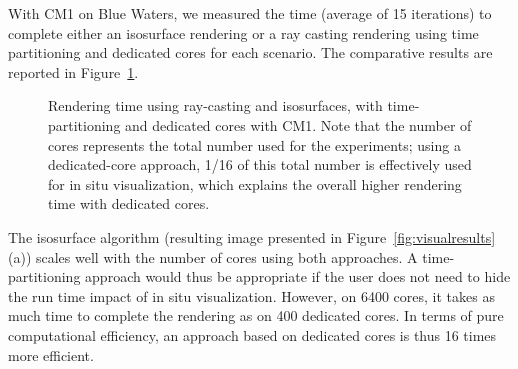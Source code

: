 With CM1 on Blue Waters, we measured the time (average of 15 
iterations) to complete either an isosurface rendering or a ray casting
rendering using time partitioning and dedicated cores for each scenario. 
The comparative results are reported in Figure~\ref{fig:cm1vistime}.

\begin{figure}[t]
\centering
	\quad
	\caption{Rendering time using ray-casting and isosurfaces, with 
	time-partitioning and dedicated cores with CM1. Note that the number of cores 
	represents the total number used for the experiments; using a dedicated-core 
	approach, 1/16 of this total number is effectively used for in situ visualization,
	which explains the overall higher rendering time with dedicated cores.}
	\label{fig:cm1vistime}
\end{figure}

The isosurface algorithm (resulting image presented in Figure~\ref{fig:visualresults} (a))
scales well with the number of cores 
using both approaches. A time-partitioning approach would thus be 
appropriate if the user does not need to hide the run time impact of in situ 
visualization.
However, on 6400 cores, it takes as much time 
to complete the rendering as on 400 dedicated cores. In
terms of pure computational efficiency, an approach based on dedicated cores is thus 16 
times more efficient.

